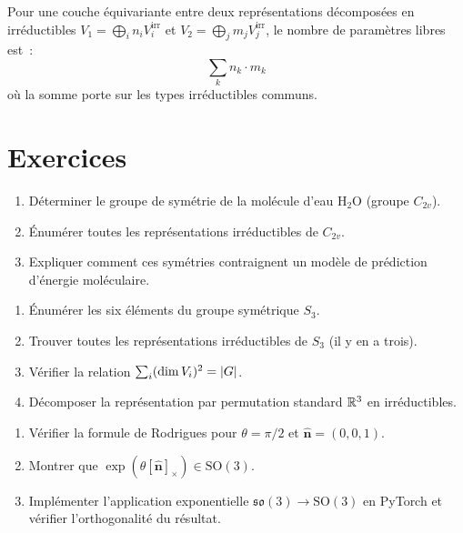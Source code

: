\begin{corollaire}
Pour une couche \'equivariante entre deux repr\'esentations d\'ecompos\'ees en
irr\'eductibles $V_1 = \bigoplus_i n_i V_i^{\text{irr}}$ et
$V_2 = \bigoplus_j m_j V_j^{\text{irr}}$, le nombre de param\`etres libres est~:
\[
    \sum_k n_k \cdot m_k
\]
o\`u la somme porte sur les types irr\'eductibles communs.
\end{corollaire}

\section*{Exercices}

\begin{exercice}
\begin{enumerate}
    \item D\'eterminer le groupe de sym\'etrie de la mol\'ecule d'eau $\mathrm{H_2O}$
          (groupe $C_{2v}$).
    \item \'Enum\'erer toutes les repr\'esentations irr\'eductibles de $C_{2v}$.
    \item Expliquer comment ces sym\'etries contraignent un mod\`ele de pr\'ediction
          d'\'energie mol\'eculaire.
\end{enumerate}
\end{exercice}

\begin{exercice}
\begin{enumerate}
    \item \'Enum\'erer les six \'el\'ements du groupe sym\'etrique $S_3$.
    \item Trouver toutes les repr\'esentations irr\'eductibles de $S_3$ (il y en a trois).
    \item V\'erifier la relation $\sum_i (\dim V_i)^2 = \left| G \right|$.
    \item D\'ecomposer la repr\'esentation par permutation standard $\mathbb{R}^3$ en
          irr\'eductibles.
\end{enumerate}
\end{exercice}

\begin{exercice}
\begin{enumerate}
    \item V\'erifier la formule de Rodrigues pour $\theta = \pi/2$ et
          $\hat{\mathbf{n}} = (0, 0, 1)$.
    \item Montrer que $\exp(\theta [\hat{\mathbf{n}}]_\times) \in \mathrm{SO}(3)$.
    \item Impl\'ementer l'application exponentielle $\mathfrak{so}(3) \to \mathrm{SO}(3)$
          en PyTorch et v\'erifier l'orthogonalit\'e du r\'esultat.
\end{enumerate}
\end{exercice}

